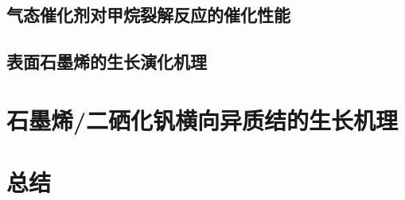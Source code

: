     \begin{figure}[htb]
        
    \end{figure}

    \subsection{气态催化剂对甲烷裂解反应的催化性能}
    \subsection{表面石墨烯的生长演化机理}
\section{石墨烯/二硒化钒横向异质结的生长机理}
\section{总结}
